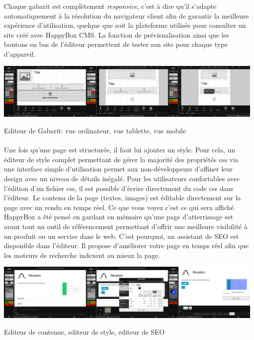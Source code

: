 \documentclass[11pt, a4paper ]{article}
\begin{document}
\begin{spacing}{1.5}
Chaque gabarit est complètement \emph{responsive}, c'est à dire qu'il s'adapte automatiquement à la résolution du navigateur client afin de garantir la meilleure expérience d'utilisation, quelque que soit la plateforme utilisée pour consulter un site créé avec HappyBox CMS. La fonction de prévisualisation ainsi que les boutons en bas de l'éditeur permettent de tester son site pour chaque type d'appareil.


\begin{center}

		\includegraphics[width=\textwidth]{images/HBscreen/editeurGabarit.png}
		\caption{Editeur de Gabarit: vue ordinateur, vue tablette, vue mobile}

\end{center}

\paragraph{} %
Une fois qu'une page est structurée, il faut lui ajouter un style. Pour cela, un éditeur de style complet permettant de gérer la majorité des propriétés css via une interface simple d'utilisation permet aux non-développeurs d'affiner leur design avec un niveau de détails inégalé. Pour les utilisateurs confortables avec l'édition d'un fichier css, il est possible d'écrire directement du code css dans l'éditeur.
Le contenu de la page (textes, images) est éditable directement sur la page avec un rendu en temps réel. Ce que vous voyez c'est ce qui sera affiché.
HappyBox a été pensé en gardant en mémoire qu'une page d’atterrissage est avant tout un outil de référencement permettant d’offrir une meilleure visibilité à un produit ou un service dans le web. C'est pourquoi, un assistant de SEO est disponible dans l'éditeur. Il propose d'améliorer votre page en temps réel afin que les moteurs de recherche indexent au mieux la page.
\begin{center}
	\includegraphics[width=\textwidth]{images/HBscreen/contenueStyleSeo.png}
	\caption{Editeur de contenue, editeur de style, editeur de SEO}
\end{center}


\end{spacing}
\end{document}

